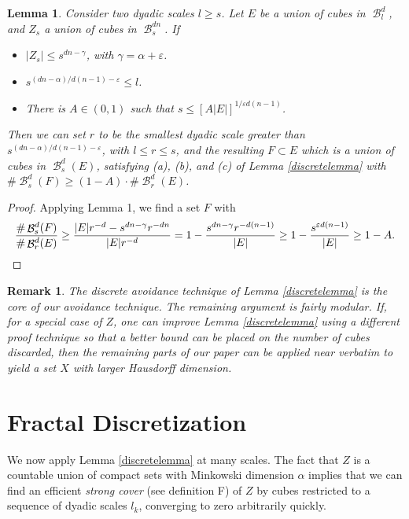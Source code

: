\documentclass[dvipsnames,letterpaper,12pt]{article}
\theoremstyle{plain}
\newtheorem{lemma}{Lemma}
\newtheorem*{remark}{Remark}
\DeclareMathOperator{\B}{\mathcal{B}}
\begin{document}
\begin{lemma} \label{ratiobound}
	Consider two dyadic scales $l \geq s$. Let $E$ be a union of cubes in $\B^d_l$, and $Z_s$ a union of cubes in $\B^{dn}_s$. If
	\begin{itemize}
		\item $|Z_s| \leq s^{dn - \gamma}$, with $\gamma = \alpha + \varepsilon$.
		\item $s^{(dn - \alpha)/d(n-1) - \varepsilon} \leq l$.
		\item There is $A \in (0,1)$ such that $s \leq [A|E|]^{1/\varepsilon d(n-1)}$.
	\end{itemize}
	Then we can set $r$ to be the smallest dyadic scale greater than $s^{(dn - \alpha)/d(n-1) - \varepsilon}$, with $l \leq r \leq s$, and the resulting $F \subset E$ which is a union of cubes in $\B^d_s(E)$, satisfying (a), (b), and (c) of Lemma \ref{discretelemma} with $\#\B_s^d(F) \geq (1 - A) \cdot \# \B_r^d(E)$.
\end{lemma}
\begin{proof}
	Applying Lemma 1, we find a set $F$ with
	\[ \frac{\# \B_s^d(F)}{\# \B_r^d(E)} \geq \frac{|E| r^{-d} - s^{dn - \gamma} r^{-dn}}{|E| r^{-d}} = 1 - \frac{s^{dn - \gamma} r^{-d(n-1)}}{|E|} \geq 1 - \frac{s^{\varepsilon d(n-1)}}{|E|} \geq 1 - A. \qedhere \]
\end{proof}

\begin{remark}
	The discrete avoidance technique of Lemma \ref{discretelemma} is the core of our avoidance technique. The remaining argument is fairly modular. If, for a special case of $Z$, one can improve Lemma \ref{discretelemma} using a different proof technique so that a better bound can be placed on the number of cubes discarded, then the remaining parts of our paper can be applied near verbatim to yield a set $X$ with larger Hausdorff dimension.
\end{remark}










\section{Fractal Discretization}\label{discretizationsection}

We now apply Lemma \ref{discretelemma} at many scales. The fact that $Z$ is a countable union of compact sets with Minkowski dimension $\alpha$ implies that we can find an efficient {\it strong cover} (see definition F) of $Z$ by cubes restricted to a sequence of dyadic scales $l_k$, converging to zero arbitrarily quickly.
\end{document}
